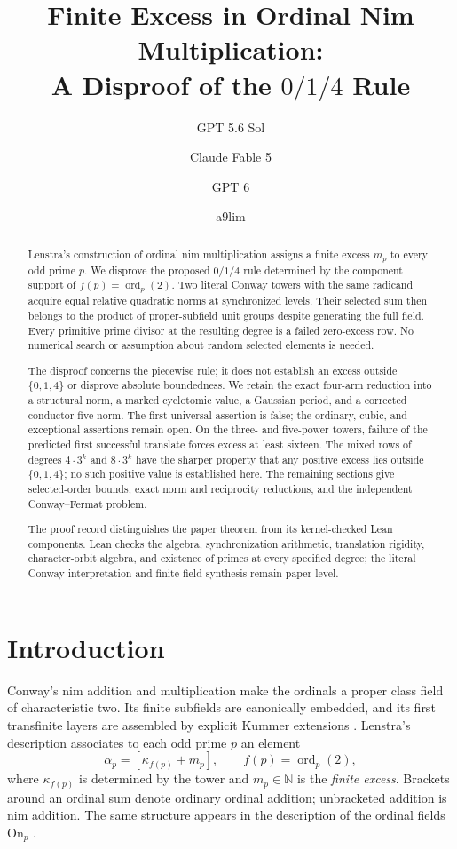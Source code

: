 \documentclass[11pt]{article}
\title{Finite Excess in Ordinal Nim Multiplication:\\
A Disproof of the $0/1/4$ Rule}
\author{GPT 5.6 Sol \and Claude Fable 5 \and GPT 6 \and a9lim}
\date{}
\theoremstyle{definition}
\theoremstyle{remark}
\begin{document}
\maketitle

\begin{abstract}
Lenstra's construction of ordinal nim multiplication assigns a finite excess
$m_p$ to every odd prime $p$.  We disprove the proposed $0/1/4$ rule determined
by the component support of $f(p)=\operatorname{ord}_p(2)$.  Two literal
Conway towers with the same radicand acquire equal relative quadratic norms
at synchronized levels.  Their selected sum then belongs to the product of
proper-subfield unit groups despite generating the full field.  Every
primitive prime divisor at the resulting degree is a failed zero-excess row.
No numerical search or assumption about random selected elements is needed.

The disproof concerns the piecewise rule; it does not establish an excess
outside $\{0,1,4\}$ or disprove absolute boundedness.  We retain the exact
four-arm reduction into a structural norm, a marked cyclotomic value, a
Gaussian period, and a corrected conductor-five norm.  The first universal
assertion is false; the ordinary, cubic, and exceptional assertions remain
open.  On the three- and five-power towers, failure of the predicted first
successful translate forces excess at least sixteen.  The
mixed rows of degrees $4\cdot3^k$ and $8\cdot3^k$ have the sharper property
that any positive excess lies outside $\{0,1,4\}$; no such positive value
is established here.  The remaining sections give selected-order bounds, exact norm and
reciprocity reductions, and the independent Conway--Fermat problem.

The proof record distinguishes the paper theorem from its kernel-checked
Lean components.  Lean checks the algebra, synchronization arithmetic,
translation rigidity, character-orbit algebra, and existence of primes at every specified degree;
the literal Conway interpretation and finite-field synthesis remain
paper-level.
\end{abstract}

\section{Introduction}

Conway's nim addition and multiplication make the ordinals a proper class
field of characteristic two.  Its finite subfields are canonically embedded,
and its first transfinite layers are assembled by explicit Kummer extensions
\cite{conway1976,lenstra1977,lenstra1978}.  Lenstra's description associates
to each odd prime $p$ an element
\[
  \alpha_p=[\kappa_{f(p)}+m_p],
  \qquad f(p)=\operatorname{ord}_p(2),
\]
where $\kappa_{f(p)}$ is determined by the tower and $m_p\in\mathbb N$ is
the \emph{finite excess}.  Brackets around an ordinal sum denote ordinary
ordinal addition; unbracketed addition is nim addition.  The same structure
appears in the description of the ordinal fields $\mathrm{On}_p$
\cite{dimuro2011}.
\end{document}
